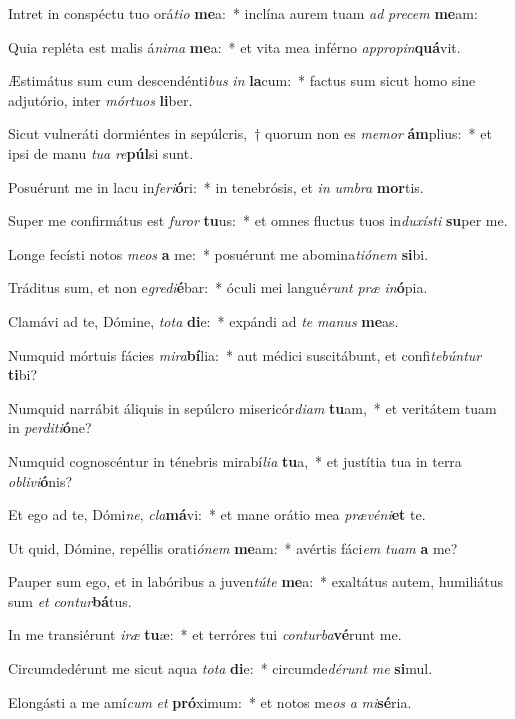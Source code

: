 \item Intret in conspéctu tuo orá\textit{ti}\textit{o} \textbf{me}a:~* inclína aurem tuam \textit{ad} \textit{pre}\textit{cem} \textbf{me}am:
\item Quia repléta est malis á\textit{ni}\textit{ma} \textbf{me}a:~* et vita mea inférno \textit{ap}\textit{pro}\textit{pin}\textbf{quá}vit.
\item Æstimátus sum cum descendénti\textit{bus} \textit{in} \textbf{la}cum:~* factus sum sicut homo sine adjutório, inter \textit{mór}\textit{tu}\textit{os} \textbf{li}ber.
\item Sicut vulneráti dormiéntes in sepúlcris,~† quorum non es \textit{me}\textit{mor} \textbf{ám}plius:~* et ipsi de manu \textit{tu}\textit{a} \textit{re}\textbf{púl}si sunt.
\item Posuérunt me in lacu in\textit{fe}\textit{ri}\textbf{ó}ri:~* in tenebrósis, et \textit{in} \textit{um}\textit{bra} \textbf{mor}tis.
\item Super me confirmátus est \textit{fu}\textit{ror} \textbf{tu}us:~* et omnes fluctus tuos in\textit{du}\textit{xís}\textit{ti} \textbf{su}per me.
\item Longe fecísti notos \textit{me}\textit{os} \textbf{a} me:~* posuérunt me abomina\textit{ti}\textit{ó}\textit{nem} \textbf{si}bi.
\item Tráditus sum, et non e\textit{gre}\textit{di}\textbf{é}bar:~* óculi mei langué\textit{runt} \textit{præ} \textit{in}\textbf{ó}pia.
\item Clamávi ad te, Dómine, \textit{to}\textit{ta} \textbf{di}e:~* expándi ad \textit{te} \textit{ma}\textit{nus} \textbf{me}as.
\item Numquid mórtuis fácies \textit{mi}\textit{ra}\textbf{bí}lia:~* aut médici suscitábunt, et confi\textit{te}\textit{bún}\textit{tur} \textbf{ti}bi?
\item Numquid narrábit áliquis in sepúlcro misericór\textit{di}\textit{am} \textbf{tu}am,~* et veritátem tuam in \textit{per}\textit{di}\textit{ti}\textbf{ó}ne?
\item Numquid cognoscéntur in ténebris mirabí\textit{li}\textit{a} \textbf{tu}a,~* et justítia tua in terra \textit{ob}\textit{li}\textit{vi}\textbf{ó}nis?
\item Et ego ad te, Dómi\textit{ne}, \textit{cla}\textbf{má}vi:~* et mane orátio mea \textit{præ}\textit{vé}\textit{ni}\textbf{et} te.
\item Ut quid, Dómine, repéllis orati\textit{ó}\textit{nem} \textbf{me}am:~* avértis fáci\textit{em} \textit{tu}\textit{am} \textbf{a} me?
\item Pauper sum ego, et in labóribus a juven\textit{tú}\textit{te} \textbf{me}a:~* exaltátus autem, humiliátus sum \textit{et} \textit{con}\textit{tur}\textbf{bá}tus.
\item In me transiérunt \textit{i}\textit{ræ} \textbf{tu}æ:~* et terróres tui \textit{con}\textit{tur}\textit{ba}\textbf{vé}runt me.
\item Circumdedérunt me sicut aqua \textit{to}\textit{ta} \textbf{di}e:~* circumde\textit{dé}\textit{runt} \textit{me} \textbf{si}mul.
\item Elongásti a me amí\textit{cum} \textit{et} \textbf{pró}ximum:~* et notos me\textit{os} \textit{a} \textit{mi}\textbf{sé}ria.
